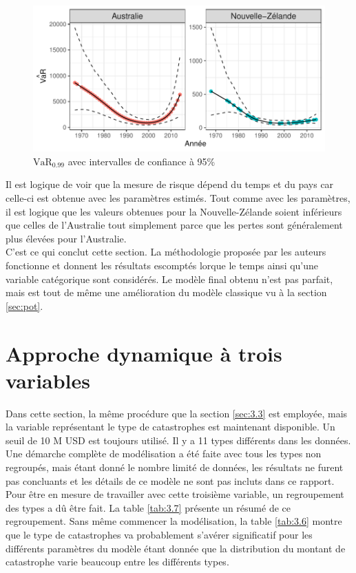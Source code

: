 \begin{figure}[h]
\begin{center}
\includegraphics{images/fig-019}
\end{center}
\caption{$\widehat{\text{VaR}_{0.99}}$ avec intervalles de confiance à 95\%}
\label{fig:3.11}
\end{figure}

Il est logique de voir que la mesure de risque dépend du temps et du pays car celle-ci est obtenue avec les paramètres estimés. Tout comme avec les paramètres, il est logique que les valeurs obtenues pour la Nouvelle-Zélande soient inférieurs que celles de l'Australie tout simplement parce que les pertes sont généralement plus élevées pour l'Australie.
\\

C'est ce qui conclut cette section. La méthodologie proposée par les auteurs fonctionne et donnent les résultats escomptés lorque le temps ainsi qu'une variable catégorique sont considérés. Le modèle final obtenu n'est pas parfait, mais est tout de même une amélioration du modèle classique vu à la section \ref{sec:pot}.


\clearpage
\section{Approche dynamique à trois variables}
\label{sec:3.4}

Dans cette section, la même procédure que la section \ref{sec:3.3} est employée, mais la variable représentant le type de catastrophes est maintenant disponible. Un seuil de 10 M USD est toujours utilisé. Il y a 11 types différents dans les données. Une démarche complète de modélisation a été faite avec tous les types non regroupés, mais étant donné le nombre limité de données, les résultats ne furent pas concluants et les détails de ce modèle ne sont pas incluts dans ce rapport. Pour être en mesure de travailler avec cette troisième variable, un regroupement des types a dû être fait. La table \ref{tab:3.7} présente un résumé de ce regroupement. Sans même commencer la modélisation, la table \ref{tab:3.6} montre que le type de catastrophes va probablement s'avérer significatif pour les différents paramètres du modèle étant donnée que la distribution du montant de catastrophe varie beaucoup entre les différents types. 


